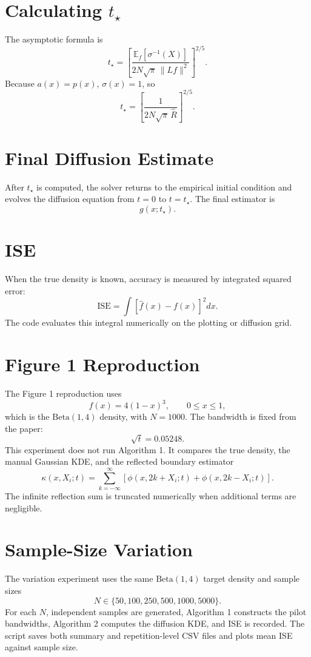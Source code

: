 \documentclass[11pt]{article}
\begin{document}
\section{Calculating \(t_\star\)}

The asymptotic formula is
\[
t_\star
=
\left[
\frac{\mathbb E_f[\sigma^{-1}(X)]}
{2N\sqrt{\pi}\,\|Lf\|^2}
\right]^{2/5}.
\]
Because \(a(x)=p(x)\), \(\sigma(x)=1\), so
\[
t_\star
=
\left[
\frac{1}
{2N\sqrt{\pi}\,\widehat R}
\right]^{2/5}.
\]

\section{Final Diffusion Estimate}

After \(t_\star\) is computed, the solver returns to the empirical initial
condition and evolves the diffusion equation from \(t=0\) to \(t=t_\star\).
The final estimator is
\[
g(x;t_\star).
\]

\section{ISE}

When the true density is known, accuracy is measured by integrated squared
error:
\[
\mathrm{ISE}
=
\int
\left[
\widehat f(x)-f(x)
\right]^2 dx.
\]
The code evaluates this integral numerically on the plotting or diffusion
grid.

\section{Figure 1 Reproduction}

The Figure 1 reproduction uses
\[
f(x)=4(1-x)^3,\qquad 0\le x\le 1,
\]
which is the \(\mathrm{Beta}(1,4)\) density, with \(N=1000\). The bandwidth is
fixed from the paper:
\[
\sqrt t=0.05248.
\]
This experiment does not run Algorithm 1. It compares the true density, the
manual Gaussian KDE, and the reflected boundary estimator
\[
\kappa(x,X_i;t)
=
\sum_{k=-\infty}^{\infty}
\left[
\phi(x,2k+X_i;t)+\phi(x,2k-X_i;t)
\right].
\]
The infinite reflection sum is truncated numerically when additional terms are
negligible.

\section{Sample-Size Variation}

The variation experiment uses the same \(\mathrm{Beta}(1,4)\) target density and
sample sizes
\[
N\in\{50,100,250,500,1000,5000\}.
\]
For each \(N\), independent samples are generated, Algorithm 1 constructs the
pilot bandwidths, Algorithm 2 computes the diffusion KDE, and ISE is recorded.
The script saves both summary and repetition-level CSV files and plots mean
ISE against sample size.
\end{document}
